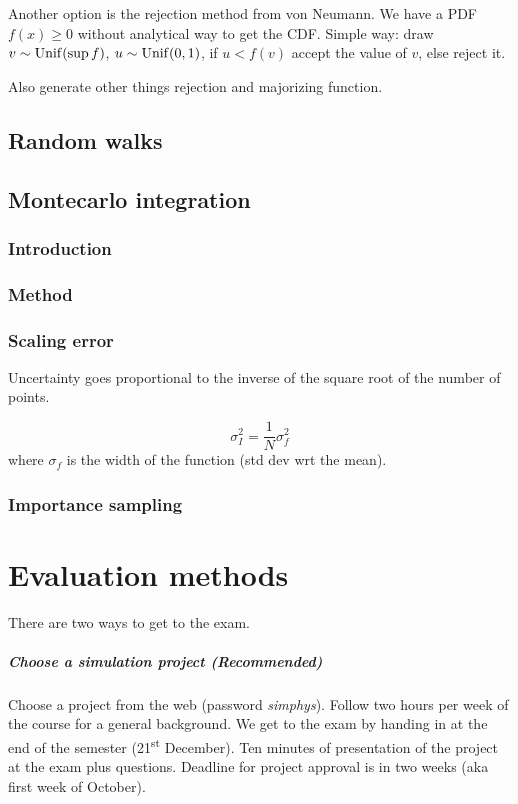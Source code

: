 \documentclass[palatino]{epflnotes}
\begin{document}
Another option is the rejection method from von Neumann. We have a PDF $f(x) ≥ 0$ without analytical way to get the CDF. Simple way: draw $v \sim \mathrm{Unif}(\sup f)$, $u \sim \mathrm{Unif}(0,1)$, if $u < f(v)$ accept the value of $v$, else reject it.

Also generate other things rejection and majorizing function.

\section{Random walks}

\section{Montecarlo integration}

\subsection{Introduction}

\subsection{Method}

\subsection{Scaling error}

Uncertainty goes proportional to the inverse of the square root of the number of points.

\[ σ_I^2 = \frac{1}{N} σ_f^2 \] where $σ_f$ is the width of the function (std dev wrt the mean).

\subsection{Importance sampling}

\appendix

\chapter{Evaluation methods}

There are two ways to get to the exam.

\paragraph{Choose a simulation project (Recommended)} Choose a project from the web (password \textit{simphys}). Follow two hours per week of the course for a general background. We get to the exam by handing in at the end of the semester (21\textsuperscript{st} December). Ten minutes of presentation of the project at the exam plus questions. Deadline for project approval is in two weeks (aka first week of October).
\end{document}
